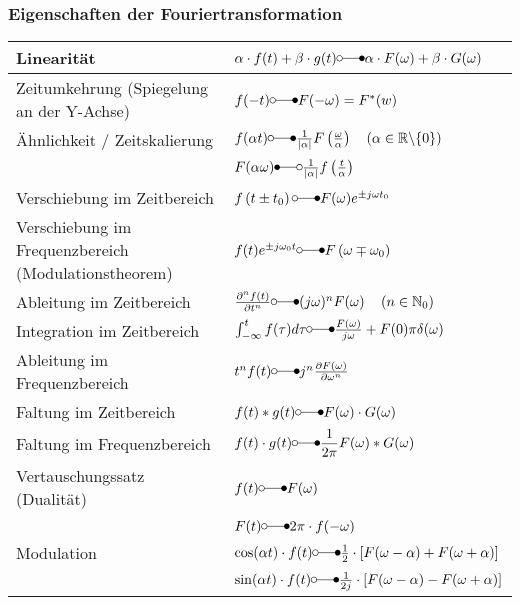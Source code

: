 \subsubsection{Eigenschaften der Fouriertransformation}
\begin{tabular}{|l|l|}
	\hline Linearität	&	$\alpha \cdot f(t)+\beta \cdot g(t) \laplace \alpha \cdot F(\omega)+\beta \cdot G(\omega)$\\
	\hline Zeitumkehrung (Spiegelung an der Y-Achse) & $f(-t) \laplace F(-\omega)=F^{*}(w)$\\ 
	\hline Ähnlichkeit / Zeitskalierung & $f(\alpha t) \laplace \frac{1}{|\alpha|} F\left(\frac{\omega}{\alpha}\right) \quad\left(\alpha \in \mathbb{R} \backslash\{0\}\right)$\\
	& $F(\alpha \omega) \Laplace \frac{1}{|\alpha|} f\left(\frac{t}{\alpha}\right)$\\
	\hline Verschiebung im Zeitbereich	& $f\left(t \pm t_{0}\right) \laplace F(\omega) e^{\pm j \omega t_{0}}$\\
	\hline Verschiebung im Frequenzbereich (Modulationstheorem)	& $f(t) e^{\pm j \omega_{0} t} \laplace F\left(\omega \mp \omega_{0}\right)$\\
	\hline Ableitung im Zeitbereich		& $\frac{\partial^{n} f(t)}{\partial t^{n}} \laplace (j \omega)^{n} F(\omega) \quad\left(n \in \mathbb{N}_{0}\right)$\\
	\hline Integration im Zeitbereich	& $\int_{-\infty}^{t} f(\tau) d \tau \laplace \frac{F(\omega)}{j \omega}+F(0) \pi \delta(\omega)$\\
	\hline Ableitung im Frequenzbereich	& $t^{n}f(t) \laplace j^{n}\frac{\partial F(\omega)}{\partial \omega^{n}}$\\
	\hline Faltung im Zeitbereich		& $f(t)*g(t) \laplace F(\omega) \cdot G(\omega)$\\
	\hline Faltung im Frequenzbereich	& $f(t) \cdot g(t) \laplace \dfrac{1}{2 \pi}F(\omega) * G(\omega)$\\
	\hline Vertauschungssatz (Dualität)	& $f(t) \laplace F(\omega)$\\
	& $F(t) \laplace 2 \pi \cdot f(-\omega)$\\
	\hline Modulation					& $\cos(\alpha t)\cdot f(t) \laplace \frac{1}{2} \cdot \left[F(\omega-\alpha)+F(\omega+\alpha)\right]$\\
	& $\sin(\alpha t)\cdot f(t) \laplace \frac{1}{2j} \cdot \left[F(\omega-\alpha)-F(\omega+\alpha)\right]$\\
	\hline
\end{tabular}
\renewcommand{\arraystretch}{1}